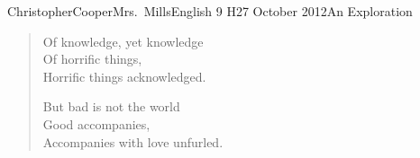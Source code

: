 \documentclass[12pt,letterpaper]{article}
\begin{document}
\begin{mla}{Christopher}{Cooper}{Mrs.~Mills}{English 9 H}{27 October 2012}{An Exploration}
\begin{verse}
Of knowledge, yet knowledge \\
Of horrific things, \\
Horrific things acknowledged.

But bad is not the world \\
Good accompanies, \\
Accompanies with love unfurled.
\end{verse}

\doublespacing



\end{mla}
\end{document}
